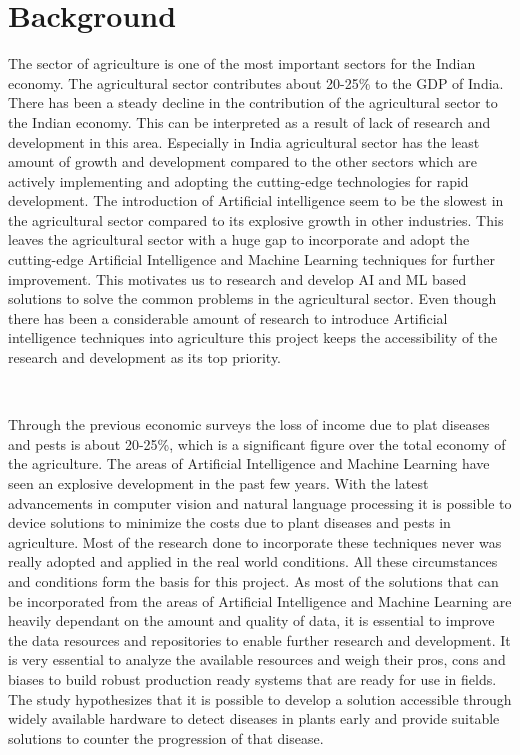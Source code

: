 \section{Background}

The sector of agriculture is one of the most important sectors for the Indian economy. The agricultural sector contributes about 20-25\% to the GDP of India. There has been a steady decline in the contribution of the agricultural sector to the Indian economy. This can be interpreted as a result of lack of research and development in this area. Especially in India agricultural sector has the least amount of growth and development compared to the other sectors which are actively implementing and adopting the cutting-edge technologies for rapid development. The introduction of Artificial intelligence seem to be the slowest in the agricultural sector compared to its explosive growth in other industries. This leaves the agricultural sector with a huge gap to incorporate and adopt the cutting-edge Artificial Intelligence and Machine Learning techniques for further improvement. This motivates us to research and develop AI and ML based solutions to solve the common problems in the agricultural sector. Even though there has been a considerable amount of research to introduce Artificial intelligence techniques into agriculture this project keeps the accessibility of the research and development as its top priority. 


\

Through the previous economic surveys the loss of income due to plat diseases and pests is about 20-25\%, which is a significant figure over the total economy of the agriculture. The areas of Artificial Intelligence and Machine Learning have seen an explosive development in the past few years. With the latest advancements in computer vision and natural language processing it is possible to device solutions to minimize the costs due to plant diseases and pests in agriculture. Most of the research done to incorporate these techniques never was really adopted and applied in the real world conditions. All these circumstances and conditions form the basis for this project. As most of the solutions that can be incorporated from the areas of Artificial Intelligence and Machine Learning are heavily dependant on the amount and quality of data, it is essential to improve the data resources and repositories to enable further research and development. It is very essential to analyze the available resources and weigh their pros, cons and biases to build robust production ready systems that are ready for use in fields. The study hypothesizes that it is possible to develop a solution accessible through widely available hardware to detect diseases in plants early and provide suitable solutions to counter the progression of that disease.


